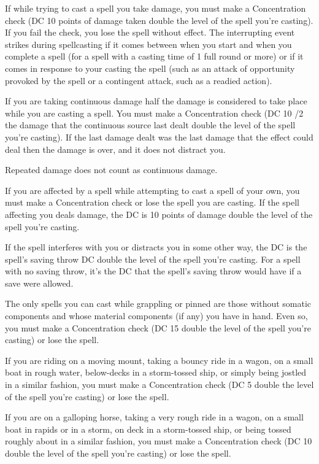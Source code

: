  If while trying to cast a spell you take damage, you must make a Concentration check (DC 10 \add points of damage taken \add double the level of the spell you're casting). If you fail the check, you lose the spell without effect. The interrupting event strikes during spellcasting if it comes between when you start and when you complete a spell (for a spell with a casting time of 1 full round or more) or if it comes in response to your casting the spell (such as an attack of opportunity provoked by the spell or a contingent attack, such as a readied action).

If you are taking continuous damage half the damage is considered to take place while you are casting a spell. You must make a Concentration check (DC 10 /2 the damage that the continuous source last dealt \add double the level of the spell you're casting). If the last damage dealt was the last damage that the effect could deal then the damage is over, and it does not distract you.

Repeated damage does not count as continuous damage.

 If you are affected by a spell while attempting to cast a spell of your own, you must make a Concentration check or lose the spell you are casting. If the spell affecting you deals damage, the DC is 10 \add points of damage \add double the level of the spell you're casting.

If the spell interferes with you or distracts you in some other way, the DC is the spell's saving throw DC \add double the level of the spell you're casting. For a spell with no saving throw, it's the DC that the spell's saving throw would have if a save were allowed.

 The only spells you can cast while grappling or pinned are those without somatic components and whose material components (if any) you have in hand. Even so, you must make a Concentration check (DC 15 \add double the level of the spell you're casting) or lose the spell.

 If you are riding on a moving mount, taking a bouncy ride in a wagon, on a small boat in rough water, below-decks in a storm-tossed ship, or simply being jostled in a similar fashion, you must make a Concentration check (DC 5 \add double the level of the spell you're casting) or lose the spell.

 If you are on a galloping horse, taking a very rough ride in a wagon, on a small boat in rapids or in a storm, on deck in a storm-tossed ship, or being tossed roughly about in a similar fashion, you must make a Concentration check (DC 10 \add double the level of the spell you're casting) or lose the spell.

